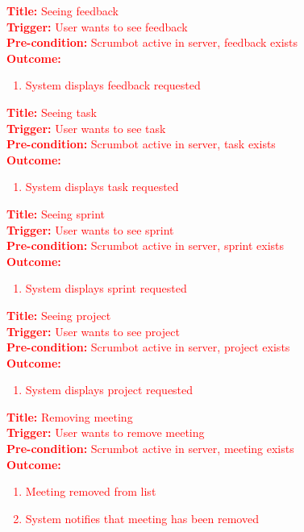 \documentclass[12pt, titlepage]{article}
\begin{document}
\noindent \textcolor{red}{\textbf{Title: }Seeing feedback}\\
\textcolor{red}{\textbf{Trigger: }User wants to see feedback}\\
\textcolor{red}{\textbf{Pre-condition: }Scrumbot active in server, feedback exists}\\
\textcolor{red}{\textbf{Outcome: }}
\textcolor{red}{
\begin{enumerate}
    \item System displays feedback requested
\end{enumerate}
}

\noindent \textcolor{red}{\textbf{Title: }Seeing task}\\
\textcolor{red}{\textbf{Trigger: }User wants to see task}\\
\textcolor{red}{\textbf{Pre-condition: }Scrumbot active in server, task exists}\\
\textcolor{red}{\textbf{Outcome: }}
\textcolor{red}{
\begin{enumerate}
    \item System displays task requested
\end{enumerate}
}

\noindent \textcolor{red}{\textbf{Title: }Seeing sprint}\\
\textcolor{red}{\textbf{Trigger: }User wants to see sprint}\\
\textcolor{red}{\textbf{Pre-condition: }Scrumbot active in server, sprint exists}\\
\textcolor{red}{\textbf{Outcome: }}
\textcolor{red}{
\begin{enumerate}
    \item System displays sprint requested
\end{enumerate}
}

\noindent \textcolor{red}{\textbf{Title: }Seeing project}\\
\textcolor{red}{\textbf{Trigger: }User wants to see project}\\
\textcolor{red}{\textbf{Pre-condition: }Scrumbot active in server, project exists}\\
\textcolor{red}{\textbf{Outcome: }}
\textcolor{red}{
\begin{enumerate}
    \item System displays project requested
\end{enumerate}
}

\noindent \textcolor{red}{\textbf{Title: }Removing meeting}\\
\textcolor{red}{\textbf{Trigger: }User wants to remove meeting}\\
\textcolor{red}{\textbf{Pre-condition: }Scrumbot active in server, meeting exists}\\
\textcolor{red}{\textbf{Outcome: }}
\textcolor{red}{
\begin{enumerate}
    \item Meeting removed from list
    \item System notifies that meeting has been removed
\end{enumerate}
}
\end{document}
